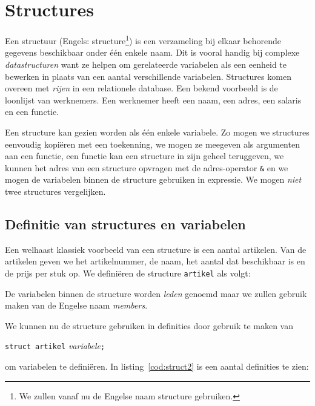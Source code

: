 \chapter{Structures}
\label{cha:structures}
\thispagestyle{empty}

Een structuur (Engels: structure\footnote{We zullen vanaf nu de Engelse naam structure gebruiken.}) is een verzameling bij elkaar behorende gegevens beschikbaar onder één enkele naam. Dit is vooral handig bij complexe \textsl{datastructuren} want ze helpen om gerelateerde variabelen als een eenheid te bewerken in plaats van een aantal verschillende variabelen. Structures komen overeen met \textsl{rijen} in een relationele database. Een bekend voorbeeld is de loonlijst van werknemers. Een werknemer heeft een naam, een adres, een salaris en een functie.

Een structure kan gezien worden als één enkele variabele. Zo mogen we structures eenvoudig kopiëren met een toekenning, we mogen ze meegeven als argumenten aan een functie, een functie kan een structure in zijn geheel teruggeven, we kunnen het adres van een structure opvragen met de adres-operator \texttt{\&} en we mogen de variabelen binnen de structure gebruiken in expressie. We mogen \textsl{niet} twee structures vergelijken.

\section{Definitie van structures en variabelen}
Een welhaast klassiek voorbeeld van een structure is een aantal artikelen. Van de artikelen geven we het artikelnummer, de naam, het aantal dat beschikbaar is en de prijs per stuk op. We definiëren de structure \texttt{artikel} als volgt:


De variabelen binnen de structure worden \textsl{leden} genoemd maar we zullen gebruik maken van de Engelse naam \textsl{members}.

We kunnen nu de structure gebruiken in definities door gebruik te maken van

\hspace*{1em}\texttt{struct artikel} \textsl{variabele}\texttt{;}

om variabelen te definiëren. In listing~\ref{cod:struct2} is een aantal definities te zien:

